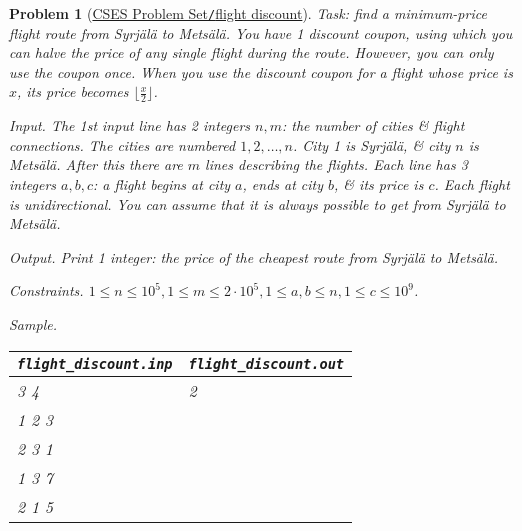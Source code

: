 \documentclass{article}
\newtheorem{problem}{Problem}
\begin{document}
\begin{problem}[\href{https://cses.fi/problemset/task/1195}{CSES Problem Set{\tt/}flight discount}]
	Task: find a minimum-price flight route from Syrjälä to Metsälä. You have 1 discount coupon, using which you can halve the price of any single flight during the route. However, you can only use the coupon once. When you use the discount coupon for a flight whose price is $x$, its price becomes $\lfloor\frac{x}{2}\rfloor$.
	\item {\sf Input.} The 1st input line has 2 integers $n,m$: the number of cities \& flight connections. The cities are numbered $1,2,\ldots,n$. City 1 is Syrjälä, \& city $n$ is Metsälä. After this there are $m$ lines describing the flights. Each line has 3 integers $a,b,c$: a flight begins at city $a$, ends at city $b$, \& its price is $c$. Each flight is unidirectional. You can assume that it is always possible to get from Syrjälä to Metsälä.
	\item {\sf Output.} Print 1 integer: the price of the cheapest route from Syrjälä to Metsälä.
	\item {\sf Constraints.} $1\le n\le10^5,1\le m\le2\cdot10^5,1\le a,b\le n,1\le c\le10^9$.
	\item {\sf Sample.}
	\begin{table}[H]
		\centering
		\begin{tabular}{|l|l|}
			\hline
			\verb|flight_discount.inp| & \verb|flight_discount.out| \\
			\hline
			3 4 & 2 \\
			1 2 3 & \\
			2 3 1 & \\
			1 3 7 & \\
			2 1 5 & \\
			\hline
		\end{tabular}
	\end{table}
\end{problem}
\end{document}
